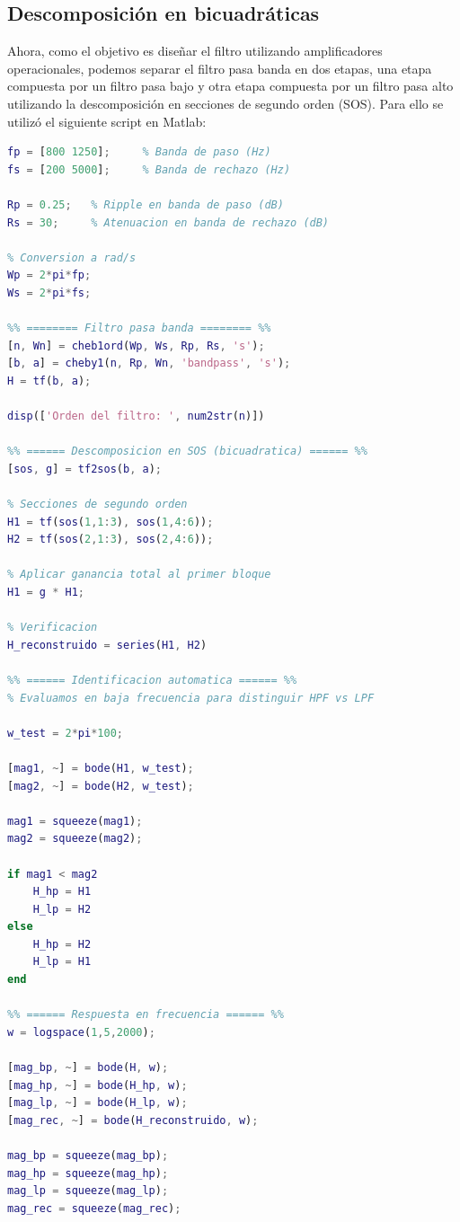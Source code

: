 \documentclass[12pt,a4paper]{article}
\begin{document}
\subsection{Descomposición en bicuadráticas}

Ahora, como el objetivo es diseñar el filtro utilizando amplificadores operacionales, podemos separar el filtro pasa banda en dos etapas, una etapa compuesta por un filtro pasa bajo y otra etapa compuesta por un filtro pasa alto utilizando la descomposición en secciones de segundo orden (SOS). Para ello se utilizó el siguiente script en Matlab:


\begin{lstlisting}[language=Matlab]
% -------- Especificaciones -------- %
fp = [800 1250];     % Banda de paso (Hz)
fs = [200 5000];     % Banda de rechazo (Hz)

Rp = 0.25;   % Ripple en banda de paso (dB)
Rs = 30;     % Atenuacion en banda de rechazo (dB)

% Conversion a rad/s
Wp = 2*pi*fp;
Ws = 2*pi*fs;

%% ======== Filtro pasa banda ======== %%
[n, Wn] = cheb1ord(Wp, Ws, Rp, Rs, 's');
[b, a] = cheby1(n, Rp, Wn, 'bandpass', 's');
H = tf(b, a);

disp(['Orden del filtro: ', num2str(n)])

%% ====== Descomposicion en SOS (bicuadratica) ====== %%
[sos, g] = tf2sos(b, a);

% Secciones de segundo orden
H1 = tf(sos(1,1:3), sos(1,4:6));
H2 = tf(sos(2,1:3), sos(2,4:6));

% Aplicar ganancia total al primer bloque
H1 = g * H1;

% Verificacion
H_reconstruido = series(H1, H2)

%% ====== Identificacion automatica ====== %%
% Evaluamos en baja frecuencia para distinguir HPF vs LPF

w_test = 2*pi*100;

[mag1, ~] = bode(H1, w_test);
[mag2, ~] = bode(H2, w_test);

mag1 = squeeze(mag1);
mag2 = squeeze(mag2);

if mag1 < mag2
    H_hp = H1
    H_lp = H2
else
    H_hp = H2
    H_lp = H1
end

%% ====== Respuesta en frecuencia ====== %%
w = logspace(1,5,2000);

[mag_bp, ~] = bode(H, w);
[mag_hp, ~] = bode(H_hp, w);
[mag_lp, ~] = bode(H_lp, w);
[mag_rec, ~] = bode(H_reconstruido, w);

mag_bp = squeeze(mag_bp);
mag_hp = squeeze(mag_hp);
mag_lp = squeeze(mag_lp);
mag_rec = squeeze(mag_rec);


\end{lstlisting}
\end{document}
